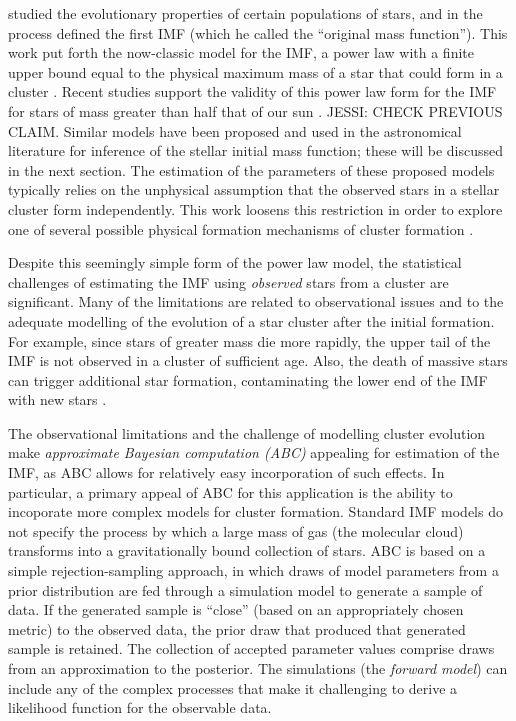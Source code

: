 \documentclass[12pt]{article}
\begin{document}
\cite{salpeter55} studied the evolutionary properties of certain 
populations of stars, and in the process defined the first IMF 
(which he called the ``original mass function'').  
This work put forth the now-classic model for the IMF, a power law 
with a finite upper bound equal to the physical maximum mass of a star that 
could form in a cluster \citep{salpeter55}.  
Recent studies support the validity of this power law form for the IMF for stars of mass greater than half that
of our sun \citep{Massey2003, bastian2010, Lim2013}.
{\color{red} JESSI: CHECK PREVIOUS CLAIM.}
Similar models have been proposed and used in the astronomical literature for inference of the 
stellar initial mass function; these will be discussed in the next section. 
The estimation of the parameters of these proposed models typically relies on the unphysical assumption that 
the observed stars in a stellar cluster form independently.
This work loosens this restriction in order to explore one of several possible physical formation 
mechanisms of cluster formation \citep{Li2017}.

Despite this seemingly simple form of the power law model, the statistical challenges of estimating the 
IMF using \emph{observed} stars from a cluster are significant. Many of the limitations are related to 
observational issues and to the adequate modelling of the evolution of a star cluster after the 
initial formation. For example, since stars of greater mass die more rapidly, the upper tail of the IMF is 
not observed in a cluster of sufficient age.  
Also, the death of massive stars can trigger additional star formation,
contaminating the lower end of the IMF with new stars \citep{Woosley2015}.

The observational limitations and the challenge of modelling cluster evolution make \emph{approximate Bayesian 
computation (ABC)} appealing for estimation of the IMF, as ABC allows for relatively easy incorporation of
such effects.
In particular, 
a primary appeal of ABC for this application is the ability to incoporate more complex models for cluster
formation. 
Standard IMF models do not specify the process by which
a large mass of gas (the molecular cloud) transforms into a gravitationally bound collection of stars. 
ABC is based on a simple rejection-sampling approach, in which draws of model parameters from a prior 
distribution are fed through a simulation model to generate a sample of data. 
If the generated sample is ``close'' (based on an appropriately chosen metric) to the 
observed data, the prior draw that produced that generated sample is retained. The collection of
accepted parameter values comprise draws from an approximation to the posterior.
The simulations
(the \emph{forward model}) can include any of the complex processes that make it challenging to derive a
likelihood function for the observable data.
\end{document}
